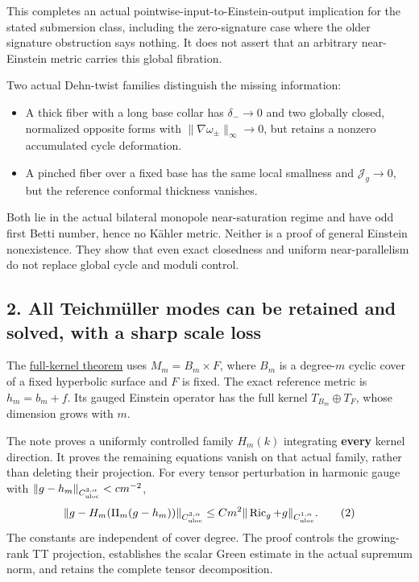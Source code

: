 \documentclass[
  11pt,
]{article}
\providecommand{\tightlist}{%
  \setlength{\itemsep}{0pt}\setlength{\parskip}{0pt}}
\begin{document}
This completes an actual pointwise-input-to-Einstein-output implication
for the stated submersion class, including the zero-signature case where
the older signature obstruction says nothing. It does not assert that an
arbitrary near-Einstein metric carries this global fibration.

Two actual Dehn-twist families distinguish the missing information:

\begin{itemize}
\tightlist
\item
  A thick fiber with a long base collar has \(\delta_-\to0\) and two
  globally closed, normalized opposite forms with
  \(\|\nabla\omega_\pm\|_\infty\to0\), but retains a nonzero accumulated
  cycle deformation.
\item
  A pinched fiber over a fixed base has the same local smallness and
  \(\mathcal J_g\to0\), but the reference conformal thickness vanishes.
\end{itemize}

Both lie in the actual bilateral monopole near-saturation regime and
have odd first Betti number, hence no Kähler metric. Neither is a proof
of general Einstein nonexistence. They show that even exact closedness
and uniform near-parallelism do not replace global cycle and moduli
control.

\hypertarget{all-teichmuxfcller-modes-can-be-retained-and-solved-with-a-sharp-scale-loss}{%
\subsection{2. All Teichmüller modes can be retained and solved, with a
sharp scale
loss}\label{all-teichmuxfcller-modes-can-be-retained-and-solved-with-a-sharp-scale-loss}}

The \href{20260924_integrable_kernel_cyclic_repair.md}{full-kernel
theorem} uses \(M_m=B_m\times F\), where \(B_m\) is a degree-\(m\)
cyclic cover of a fixed hyperbolic surface and \(F\) is fixed. The exact
reference metric is \(h_m=b_m+f\). Its gauged Einstein operator has the
full kernel \(T_{B_m}\oplus T_F\), whose dimension grows with \(m\).

The note proves a uniformly controlled family \(H_m(k)\) integrating
\textbf{every} kernel direction. It proves the remaining equations
vanish on that actual family, rather than deleting their projection. For
every tensor perturbation in harmonic gauge with
\(\|g-h_m\|_{C^{3,\alpha}_{\rm uloc}}<c m^{-2}\), \[
 \|g-H_m(\Pi_m(g-h_m))\|_{C^{3,\alpha}_{\rm uloc}}
       \le C m^2\|\operatorname{Ric}_g+g\|_{C^{1,\alpha}_{\rm uloc}}.
                                                               \tag{2}
\] The constants are independent of cover degree. The proof controls the
growing-rank TT projection, establishes the scalar Green estimate in the
actual supremum norm, and retains the complete tensor decomposition.
\end{document}
